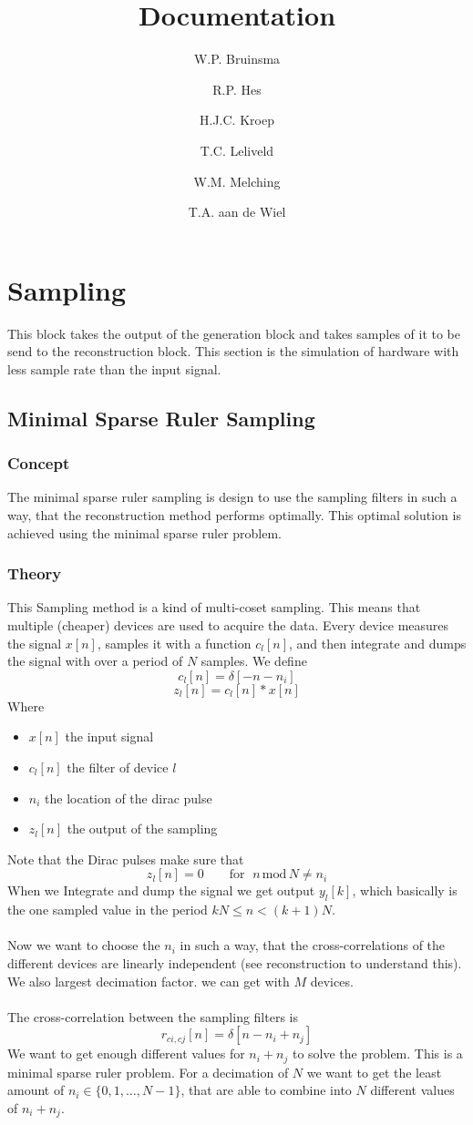 \documentclass[report, oneside, a4paper, openany]{memoir}
\title{Documentation}
\author{W.P. Bruinsma \and R.P. Hes \and H.J.C. Kroep \and T.C. Leliveld \and W.M. Melching \and T.A. aan de Wiel}
\begin{document}
\chapter{Sampling}
This block takes the output of the generation block and takes samples of it to be send to the reconstruction block. 
This section is the simulation of hardware with less sample rate than the input signal.


\section{Minimal Sparse Ruler Sampling}
\subsection{Concept}
The minimal sparse ruler sampling is design to use the sampling filters in such a way, that the reconstruction method performs optimally. This optimal solution is achieved using the minimal sparse ruler problem.
\subsection{Theory}
This Sampling method is a kind of multi-coset sampling. This means that multiple (cheaper) devices are used to acquire the data. Every device measures the signal $x[n]$, samples it with a function $c_l[n]$, and then integrate and dumps the signal with over a period of $N$ samples. We define 
$$
c_l[n] = \delta[-n -n_i]
$$
$$
z_l[n] = c_l[n]\ast x[n] 
$$
Where
\begin{itemize}
\item $x[n]$ the input signal
\item $c_l[n]$ the filter of device $l$
\item $n_i$ the location of the dirac pulse
\item $z_l[n]$ the output of the sampling
\end{itemize}
Note that the Dirac pulses make sure that
$$z_l[n]=0 \quad \quad \text{for }\;n\,\text{mod}\,N\neq n_i$$
When we Integrate and dump the signal we get output $y_l[k]$, which basically is the one sampled value in the period $kN\leq n<(k+1)N$.\\
\\
Now we want to choose the $n_i$ in such a way, that the cross-correlations of the different devices are linearly independent (see reconstruction to understand this). We also largest decimation factor. we can get with $M$ devices.\\
\\
The cross-correlation between the sampling filters is 
$$
r_{ci,cj}[n] = \delta [n-n_i+n_j]
$$
We want to get enough different values for $n_i+n_j$ to solve the problem. This is a minimal sparse ruler problem. For a decimation of $N$ we want to get the least amount of $n_i \in \{0,1,\dots,N-1\}$, that are able to combine into $N$ different values of $n_i+n_j$. 
\end{document}
